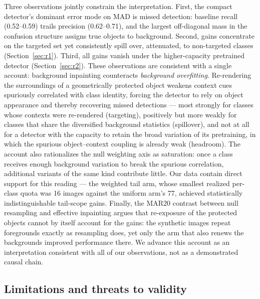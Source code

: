 \documentclass[preprint,12pt,authoryear]{elsarticle}
\begin{document}
Three observations jointly constrain the interpretation. First, the
compact detector's dominant error mode on MAD is missed detection:
baseline recall (0.52--0.59) trails precision (0.62--0.71), and the
largest off-diagonal mass in the confusion structure assigns true
objects to background. Second, gains concentrate on the targeted set yet
consistently spill over, attenuated, to non-targeted classes
(Section~\ref{sec:r1}). Third, all gains vanish under the
higher-capacity pretrained detector (Section~\ref{sec:r2}). These
observations are consistent with a single account: background inpainting
counteracts \emph{background overfitting}. Re-rendering the surroundings
of a geometrically protected object weakens context cues spuriously
correlated with class identity, forcing the detector to rely on object
appearance and thereby recovering missed detections --- most strongly
for classes whose contexts were re-rendered (targeting), positively but
more weakly for classes that share the diversified background statistics
(spillover), and not at all for a detector with the capacity to retain
the broad variation of its pretraining, in which the spurious
object--context coupling is already weak (headroom). The account also
rationalizes the null weighting axis as saturation: once a class
receives enough background variation to break the spurious correlation,
additional variants of the same kind contribute little. Our data contain
direct support for this reading --- the weighted tail arm, whose
smallest realized per-class quota was 16 images against the uniform
arm's 77, achieved statistically indistinguishable tail-scope gains.
Finally, the MAR20 contrast between null resampling and effective
inpainting argues that re-exposure of the protected objects cannot by
itself account for the gains: the synthetic images repeat foregrounds
exactly as resampling does, yet only the arm that also renews the
backgrounds improved performance there. We advance this account as an
interpretation consistent with all of our observations, not as a
demonstrated causal chain.

\subsection{Limitations and threats to validity}
\end{document}
